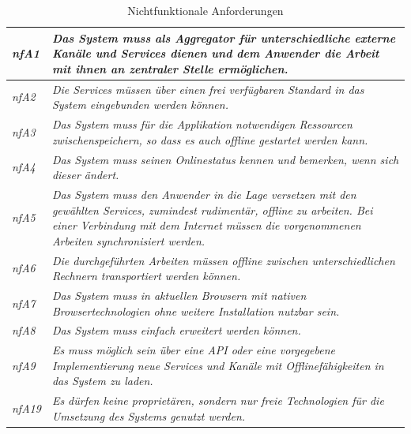 \begin{table}[ht]
\caption{Nichtfunktionale Anforderungen}
\begin{tabularx}{\textwidth}{ l | X }
\emph{nfA1} & \emph{Das System muss als Aggregator für unterschiedliche externe Kanäle und Services dienen und dem Anwender die Arbeit mit ihnen an zentraler Stelle ermöglichen.} \\ \hline
\emph{nfA2} & \emph{Die Services müssen über einen frei verfügbaren Standard in das System eingebunden werden können.} \\ \hline
\emph{nfA3} & \emph{Das System muss für die Applikation notwendigen Ressourcen zwischenspeichern, so dass es auch offline gestartet werden kann.} \\ \hline
\emph{nfA4} & \emph{Das System muss seinen Onlinestatus kennen und bemerken, wenn sich dieser ändert.} \\ \hline
\emph{nfA5} & \emph{Das System muss den Anwender in die Lage versetzen mit den gewählten Services, zumindest rudimentär, offline zu arbeiten. Bei einer Verbindung mit dem Internet müssen die vorgenommenen Arbeiten synchronisiert werden.} \\ \hline
\emph{nfA6} & \emph{Die durchgeführten Arbeiten müssen offline zwischen unterschiedlichen Rechnern transportiert werden können.} \\ \hline
\emph{nfA7} & \emph{Das System muss in aktuellen Browsern mit nativen Browsertechnologien ohne weitere Installation nutzbar sein.} \\ \hline
\emph{nfA8} & \emph{Das System muss einfach erweitert werden können.} \\ \hline
\emph{nfA9} & \emph{Es muss möglich sein über eine API oder eine vorgegebene Implementierung neue Services und Kanäle mit Offlinefähigkeiten in das System zu laden.} \\ \hline
\emph{nfA19} & \emph{Es dürfen keine proprietären, sondern nur freie Technologien für die Umsetzung des Systems genutzt werden.} \\ \hline
\end{tabularx}
\label{table:nichtfunktionale_anforderungen}
\end{table}
